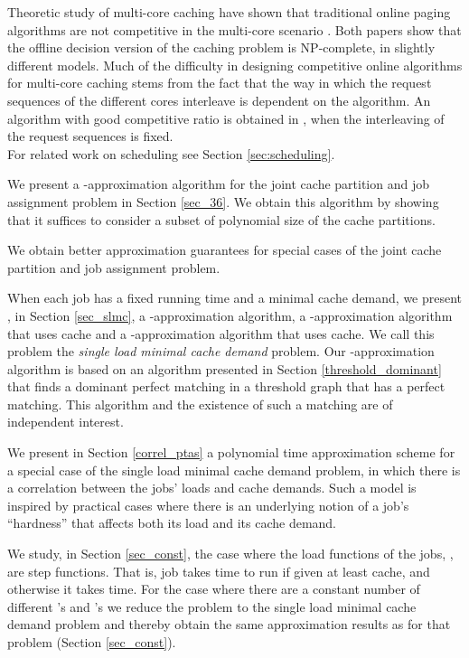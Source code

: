 \documentclass[11pt]{article}
\begin{document}
\smallskip

 Theoretic study of multi-core caching
have shown that traditional online paging algorithms are not
competitive in the multi-core scenario \cite{Hassidim, LO12}. Both
papers \cite{Hassidim, LO12} show that the offline decision version of the caching problem
is NP-complete, in slightly different models.
Much of the difficulty in designing competitive online algorithms for multi-core caching stems from the fact that the way in which the request sequences of the different cores interleave is dependent on the algorithm. An algorithm with good competitive ratio is obtained in \cite{Barve}, when the interleaving of the request sequences is fixed.\\
For related work on scheduling see Section \ref{sec:scheduling}.

\smallskip

 We present a -approximation
algorithm for the joint cache partition and job assignment problem in Section \ref{sec_36}.
We obtain this algorithm by  showing that it suffices to consider a
subset of polynomial size of the cache partitions.

We obtain better approximation guarantees for special cases of the
joint cache partition and job assignment problem.

 When each job has a fixed running time and a minimal cache demand, we present
, in Section \ref{sec_slmc}, a -approximation algorithm, a -approximation
algorithm that uses  cache and a -approximation
algorithm that uses  cache. We call this problem the {\em single load
minimal cache demand} problem.  Our -approximation algorithm is based on an algorithm presented in Section \ref{threshold_dominant} that
finds  a dominant perfect matching in a threshold graph that has a perfect matching.
This algorithm and the existence of such a matching are of independent interest.

We present in Section \ref{correl_ptas} a polynomial time approximation scheme  for a special case of the single load minimal cache demand problem,
in which there is a correlation between the jobs' loads and cache demands. Such a model is inspired by practical cases where there is an underlying notion of a job's ``hardness'' that affects both its load and its cache demand.

We study, in Section \ref{sec_const},  the case where the
load functions of the jobs, , are step functions. That is, job
 takes  time to run if given at least   cache, and
otherwise it takes  time. For the case where there are a constant number of
different 's and 's we reduce the problem to the single
load minimal cache demand problem and thereby obtain
the same approximation results as for that problem (Section \ref{sec_const}).
\end{document}

